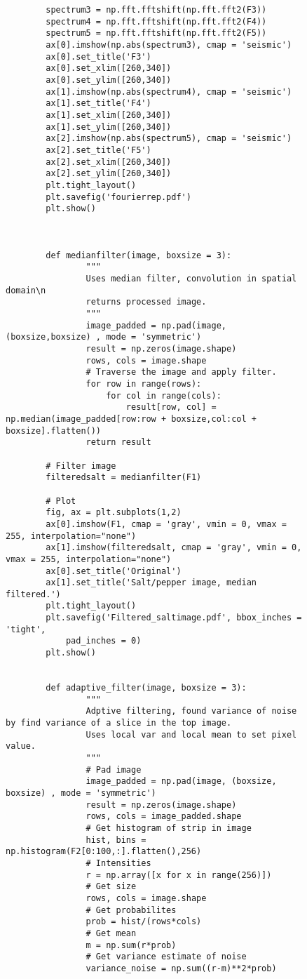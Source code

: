 {\begin{figure}[hbt!]
\begin{lstlisting}
        spectrum3 = np.fft.fftshift(np.fft.fft2(F3))
        spectrum4 = np.fft.fftshift(np.fft.fft2(F4))
        spectrum5 = np.fft.fftshift(np.fft.fft2(F5))
        ax[0].imshow(np.abs(spectrum3), cmap = 'seismic')
        ax[0].set_title('F3')
        ax[0].set_xlim([260,340])
        ax[0].set_ylim([260,340])
        ax[1].imshow(np.abs(spectrum4), cmap = 'seismic')
        ax[1].set_title('F4')
        ax[1].set_xlim([260,340])
        ax[1].set_ylim([260,340])
        ax[2].imshow(np.abs(spectrum5), cmap = 'seismic')
        ax[2].set_title('F5')
        ax[2].set_xlim([260,340])
        ax[2].set_ylim([260,340])
        plt.tight_layout()
        plt.savefig('fourierrep.pdf')
        plt.show()
        
        
        
        def medianfilter(image, boxsize = 3):
                """
                Uses median filter, convolution in spatial domain\n
                returns processed image.
                """
                image_padded = np.pad(image, (boxsize,boxsize) , mode = 'symmetric')
                result = np.zeros(image.shape)
                rows, cols = image.shape
                # Traverse the image and apply filter.
                for row in range(rows):
                    for col in range(cols):
                        result[row, col] = np.median(image_padded[row:row + boxsize,col:col + boxsize].flatten())
                return result
        
        # Filter image
        filteredsalt = medianfilter(F1)
        
        # Plot
        fig, ax = plt.subplots(1,2)
        ax[0].imshow(F1, cmap = 'gray', vmin = 0, vmax = 255, interpolation="none")
        ax[1].imshow(filteredsalt, cmap = 'gray', vmin = 0, vmax = 255, interpolation="none")
        ax[0].set_title('Original')
        ax[1].set_title('Salt/pepper image, median filtered.')
        plt.tight_layout()
        plt.savefig('Filtered_saltimage.pdf', bbox_inches = 'tight',
            pad_inches = 0)
        plt.show()
        

        def adaptive_filter(image, boxsize = 3):
                """
                Adptive filtering, found variance of noise by find variance of a slice in the top image.
                Uses local var and local mean to set pixel value.
                """
                # Pad image
                image_padded = np.pad(image, (boxsize, boxsize) , mode = 'symmetric')
                result = np.zeros(image.shape)
                rows, cols = image_padded.shape
                # Get histogram of strip in image
                hist, bins = np.histogram(F2[0:100,:].flatten(),256)
                # Intensities
                r = np.array([x for x in range(256)])
                # Get size
                rows, cols = image.shape
                # Get probabilites
                prob = hist/(rows*cols)
                # Get mean
                m = np.sum(r*prob)
                # Get variance estimate of noise
                variance_noise = np.sum((r-m)**2*prob)
                

\end{lstlisting}
\end{figure}}
